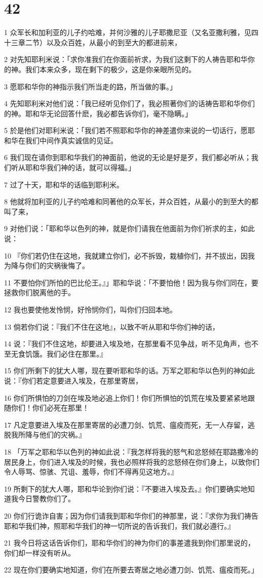 \chapter{42}

\par 1 众军长和加利亚的儿子约哈难，并何沙雅的儿子耶撒尼亚（又名亚撒利雅，见四十三章二节）以及众百姓，从最小的到至大的都进前来，
\par 2 对先知耶利米说：「求你准我们在你面前祈求，为我们这剩下的人祷告耶和华你的神。我们本来众多，现在剩下的极少，这是你亲眼所见的。
\par 3 愿耶和华你的神指示我们所当走的路，所当做的事。」
\par 4 先知耶利米对他们说：「我已经听见你们了，我必照著你们的话祷告耶和华你们的神。耶和华无论回答什麽，我必都告诉你们，毫不隐瞒。」
\par 5 於是他们对耶利米说：「我们若不照耶和华你的神差遣你来说的一切话行，愿耶和华在我们中间作真实诚信的见证。
\par 6 我们现在请你到耶和华我们的神面前，他说的无论是好是歹，我们都必听从；我们听从耶和华我们神的话，就可以得福。」
\par 7 过了十天，耶和华的话临到耶利米。
\par 8 他就将加利亚的儿子约哈难和同著他的众军长，并众百姓，从最小的到至大的都叫了来，
\par 9 对他们说：「耶和华以色列的神，就是你们请我在他面前为你们祈求的主，如此说：
\par 10 『你们若仍住在这地，我就建立你们，必不拆毁，栽植你们，并不拔出，因我为降与你们的灾祸後悔了。
\par 11 不要怕你们所怕的巴比伦王。』」耶和华说：「不要怕他！因为我与你们同在，要拯救你们脱离他的手。
\par 12 我也要使他发怜悯，好怜悯你们，叫你们归回本地。
\par 13 倘若你们说：『我们不住在这地』，以致不听从耶和华你们神的话，
\par 14 说：『我们不住这地，却要进入埃及地，在那里看不见争战，听不见角声，也不至无食饥饿。我们必住在那里。』
\par 15 你们所剩下的犹大人哪，现在要听耶和华的话。万军之耶和华以色列的神如此说：『你们若定意要进入埃及，在那里寄居，
\par 16 你们所惧怕的刀剑在埃及地必追上你们！你们所惧怕的饥荒在埃及要紧紧地跟随你们！你们必死在那里！
\par 17 凡定意要进入埃及在那里寄居的必遭刀剑、饥荒、瘟疫而死，无一人存留，逃脱我所降与他们的灾祸。』
\par 18 「万军之耶和华以色列的神如此说：『我怎样将我的怒气和忿怒倾在耶路撒冷的居民身上，你们进入埃及的时候，我也必照样将我的忿怒倾在你们身上，以致你们令人辱骂、惊骇、咒诅、羞辱，你们不得再见这地方。』
\par 19 所剩下的犹大人哪，耶和华论到你们说：『不要进入埃及去。』你们要确实地知道我今日警教你们了。
\par 20 你们行诡诈自害；因为你们请我到耶和华你们的神那里，说：『求你为我们祷告耶和华我们神，照耶和华我们的神一切所说的告诉我们，我们就必遵行。』
\par 21 我今日将这话告诉你们，耶和华你们的神为你们的事差遣我到你们那里说的，你们却一样没有听从。
\par 22 现在你们要确实地知道，你们在所要去寄居之地必遭刀剑、饥荒、瘟疫而死。」

